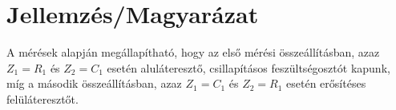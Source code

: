 \documentclass[10pt, conference,a4paper]{ITKproc}
\begin{document}
\section{Jellemzés/Magyarázat}
A mérések alapján megállapítható, hogy az első mérési összeállításban, azaz $Z_1 = R_1$ és $Z_2 = C_1$ esetén aluláteresztő, csillapításos feszültségosztót kapunk, míg a második összeállításban, azaz $Z_1 = C_1$ és $Z_2 = R_1$ esetén erősítéses felüláteresztőt. 









%


\end{document}
